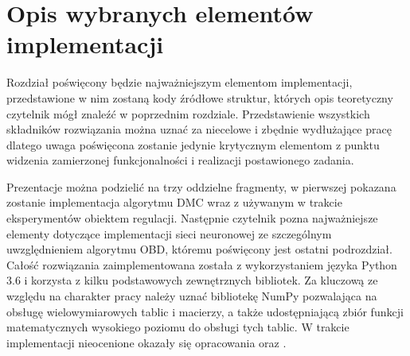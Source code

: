 \newpage %
\section{Opis wybranych elementów implementacji}
Rozdział poświęcony będzie najważniejszym elementom implementacji, przedstawione w nim zostaną kody źródłowe struktur, których opis teoretyczny czytelnik mógł znaleźć w poprzednim rozdziale. Przedstawienie wszystkich składników rozwiązania można uznać za niecelowe i zbędnie wydłużające pracę dlatego uwaga poświęcona zostanie jedynie krytycznym elementom z punktu widzenia zamierzonej funkcjonalności i realizacji postawionego zadania.
\par Prezentacje można podzielić na trzy oddzielne fragmenty, w pierwszej pokazana zostanie implementacja algorytmu DMC wraz z używanym w trakcie eksperymentów obiektem regulacji. Następnie czytelnik pozna najważniejsze elementy dotyczące implementacji sieci neuronowej ze szczególnym uwzględnieniem algorytmu OBD, któremu poświęcony jest ostatni podrozdział. Całość rozwiązania zaimplementowana została z wykorzystaniem języka Python 3.6 i korzysta z kilku podstawowych zewnętrznych bibliotek. Za kluczową ze względu na charakter pracy należy uznać bibliotekę NumPy pozwalająca na obsługę wielowymiarowych tablic i macierzy, a także udostępniającą zbiór funkcji matematycznych wysokiego poziomu do obsługi tych tablic. W trakcie implementacji nieocenione okazały się opracowania \cite{nielsen2015} oraz \cite{wawrzynski2019}. 

